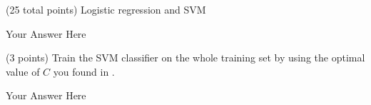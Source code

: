 \documentclass[12pt]{article}
\begin{document}
\begin{question}{(25 total points) Logistic regression and SVM}
\begin{subquestion}
   

      \begin{answerbox}{30em}
         Your Answer Here
      \end{answerbox}
  


   \end{subquestion}
   \begin{subquestion}{(3 points)
       Train the SVM classifier on the whole training set by using the
       optimal value of $C$ you found in . 
     } \label{Q2.6}


       

      \begin{answerbox}{10em}
         Your Answer Here
      \end{answerbox}
  


   \end{subquestion}
%
%

\end{question}
\clearpage
%
%
\end{document}
